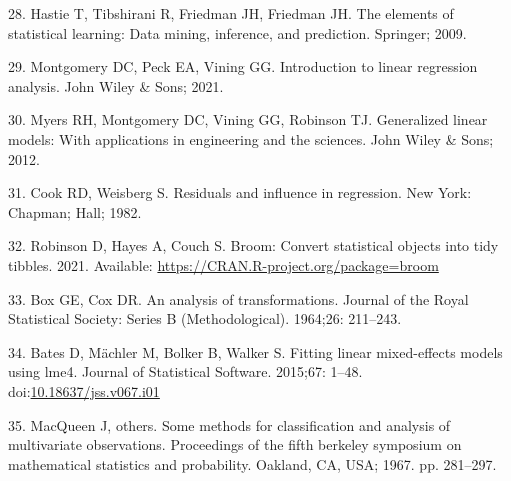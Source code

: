 \documentclass[10pt,letterpaper]{article}
\begin{document}
\leavevmode\hypertarget{ref-hastie2009elements}{}%
28. Hastie T, Tibshirani R, Friedman JH, Friedman JH. The elements of
statistical learning: Data mining, inference, and prediction. Springer;
2009.

\leavevmode\hypertarget{ref-montgomery2021introduction}{}%
29. Montgomery DC, Peck EA, Vining GG. Introduction to linear regression
analysis. John Wiley \& Sons; 2021.

\leavevmode\hypertarget{ref-myers2012generalized}{}%
30. Myers RH, Montgomery DC, Vining GG, Robinson TJ. Generalized linear
models: With applications in engineering and the sciences. John Wiley \&
Sons; 2012.

\leavevmode\hypertarget{ref-cook1982residuals}{}%
31. Cook RD, Weisberg S. Residuals and influence in regression. New
York: Chapman; Hall; 1982.

\leavevmode\hypertarget{ref-robinson2021broom}{}%
32. Robinson D, Hayes A, Couch S. Broom: Convert statistical objects
into tidy tibbles. 2021. Available:
\url{https://CRAN.R-project.org/package=broom}

\leavevmode\hypertarget{ref-box1964analysis}{}%
33. Box GE, Cox DR. An analysis of transformations. Journal of the Royal
Statistical Society: Series B (Methodological). 1964;26: 211--243.

\leavevmode\hypertarget{ref-bates2015lme4}{}%
34. Bates D, Mächler M, Bolker B, Walker S. Fitting linear mixed-effects
models using lme4. Journal of Statistical Software. 2015;67: 1--48.
doi:\href{https://doi.org/10.18637/jss.v067.i01}{10.18637/jss.v067.i01}

\leavevmode\hypertarget{ref-macqueen1967some}{}%
35. MacQueen J, others. Some methods for classification and analysis of
multivariate observations. Proceedings of the fifth berkeley symposium
on mathematical statistics and probability. Oakland, CA, USA; 1967. pp.
281--297.

\nolinenumbers
\end{document}
